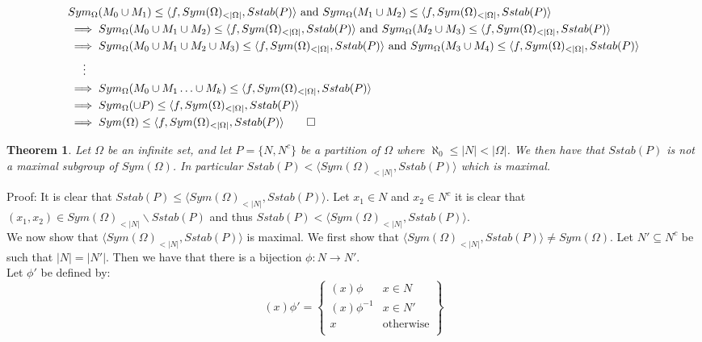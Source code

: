 \documentclass{report}
\newtheorem{theorem}{Theorem}[section]
\begin{document}
\begin{align*}
&Sym_{\Omega}(M_{0}\cup M_{1}) \leq \langle f,  Sym(\Omega)_{<\vert \Omega \vert},Sstab(P) \rangle \text{ and } Sym_{\Omega}(M_{1}\cup M_{2}) \leq \langle f,  Sym(\Omega)_{<\vert \Omega \vert},Sstab(P) \rangle \\
&\implies Sym_{\Omega}(M_{0}\cup M_{1} \cup M_{2}) \leq \langle f,  Sym(\Omega)_{<\vert \Omega \vert},Sstab(P) \rangle \text{ and } Sym_{\Omega}(M_{2}\cup M_{3}) \leq \langle f,  Sym(\Omega)_{<\vert \Omega \vert},Sstab(P) \rangle\\
&\implies Sym_{\Omega}(M_{0}\cup M_{1} \cup M_{2} \cup M_{3}) \leq \langle f,  Sym(\Omega)_{<\vert \Omega \vert},Sstab(P) \rangle \text{ and } Sym_{\Omega}(M_{3}\cup M_{4}) \leq \langle f,  Sym(\Omega)_{<\vert \Omega \vert},Sstab(P) \rangle \\
& \ \ \ \ \vdots\\
&\implies Sym_{\Omega}(M_{0} \cup M_1 \ldots \cup M_{k}) \leq \langle f,  Sym(\Omega)_{<\vert \Omega \vert},Sstab(P) \rangle \\
&\implies Sym_{\Omega}(\cup P) \leq \langle f,  Sym(\Omega)_{<\vert \Omega \vert},Sstab(P) \rangle \\
&\implies Sym(\Omega) \leq \langle f,  Sym(\Omega)_{<\vert \Omega \vert},Sstab(P) \rangle \qed
\end{align*}
\begin{theorem}\label{infstab}
Let $\Omega$ be an infinite set, and let $P=\{N,N^c\}$ be a partition of $\Omega$ where $\aleph_0 \leq \vert N \vert < \vert \Omega \vert$. We then have that $Sstab(P)$ is not a maximal subgroup of $Sym(\Omega)$. In particular $Sstab(P)< \langle Sym(\Omega)_{<\vert N \vert},Sstab(P)\rangle$ which is maximal.
\end{theorem}\par
Proof: It is clear that $Sstab(P) \leq \langle Sym(\Omega)_{<\vert N \vert},Sstab(P)\rangle$. Let $x_1 \in N$ and $x_2 \in N^c$ it is clear that $(x_1, x_2) \in Sym(\Omega)_{<\vert N \vert}\backslash Sstab(P)$ and thus $Sstab(P) < \langle Sym(\Omega)_{<\vert N \vert},Sstab(P)\rangle$.\\
We now show that $\langle Sym(\Omega)_{<\vert N \vert},Sstab(P)\rangle$ is maximal. We first show that $\langle Sym(\Omega)_{<\vert N \vert},Sstab(P)\rangle \neq Sym(\Omega)$.
Let $N' \subseteq N^c$ be such that $\vert N \vert = \vert N' \vert$. Then we have that there is a bijection $\phi:N \rightarrow N'$.\\
Let $\phi'$ be defined by:
\[(x)\phi' =  \left\{
    \begin{array}{lr}
      (x)\phi&  x\in N  \\
      (x)\phi^{-1}& x\in N'\\
      x& \text{otherwise}\\
    \end{array}
    \right\}\]
\end{document}
